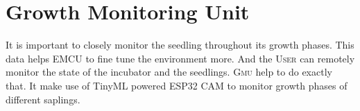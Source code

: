 \documentclass[../../main]{subfiles}
\begin{document}
\section{Growth Monitoring Unit} \label{sec:}

It is important to closely monitor the seedling throughout its growth phases.
This data helps EMCU to fine tune the environment more. And the \textsc{User} can
remotely monitor the state of the incubator and the seedlings. \textsc{Gmu} help
to do exactly that. It make use of TinyML powered ESP32 CAM to monitor growth
phases of different saplings.
\end{document}
